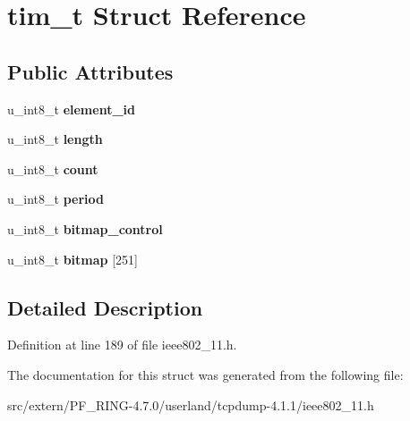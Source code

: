 \hypertarget{structtim__t}{
\section{tim\_\-t Struct Reference}
\label{structtim__t}
}
\subsection*{Public Attributes}
\begin{DoxyCompactItemize}
\item 
\hypertarget{structtim__t_a29c7581b424ccbdeb2b44d12fd6a12ac}{
u\_\-int8\_\-t {\bfseries element\_\-id}}
\label{structtim__t_a29c7581b424ccbdeb2b44d12fd6a12ac}

\item 
\hypertarget{structtim__t_aa979b0def85d0afe16e6626f572cc8de}{
u\_\-int8\_\-t {\bfseries length}}
\label{structtim__t_aa979b0def85d0afe16e6626f572cc8de}

\item 
\hypertarget{structtim__t_a851df0f5ded8632aeac4043e92dccaa1}{
u\_\-int8\_\-t {\bfseries count}}
\label{structtim__t_a851df0f5ded8632aeac4043e92dccaa1}

\item 
\hypertarget{structtim__t_ae80444cc89f4ebbd306e1e0e4f03c869}{
u\_\-int8\_\-t {\bfseries period}}
\label{structtim__t_ae80444cc89f4ebbd306e1e0e4f03c869}

\item 
\hypertarget{structtim__t_af4ccacd514604f4920c6256a4d20e8ad}{
u\_\-int8\_\-t {\bfseries bitmap\_\-control}}
\label{structtim__t_af4ccacd514604f4920c6256a4d20e8ad}

\item 
\hypertarget{structtim__t_a8e5e7bc2407c2d26e1473f0a969249aa}{
u\_\-int8\_\-t {\bfseries bitmap} \mbox{[}251\mbox{]}}
\label{structtim__t_a8e5e7bc2407c2d26e1473f0a969249aa}

\end{DoxyCompactItemize}


\subsection{Detailed Description}


Definition at line 189 of file ieee802\_\-11.h.



The documentation for this struct was generated from the following file:\begin{DoxyCompactItemize}
\item 
src/extern/PF\_\-RING-\/4.7.0/userland/tcpdump-\/4.1.1/ieee802\_\-11.h\end{DoxyCompactItemize}
